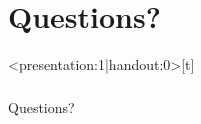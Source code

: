 \documentclass[a4paper,10pt,xcolor=pdftex,dvipsnames,table]{beamer}
\begin{document}
\section{Questions?}
\begin{frame}<presentation:1|handout:0>[t]\frametitle{}
    \note{~}
    \begin{center}
      \vspace*{-0.5cm}\huge{Questions?}\\
    \end{center}
\end{frame}
\end{document}
